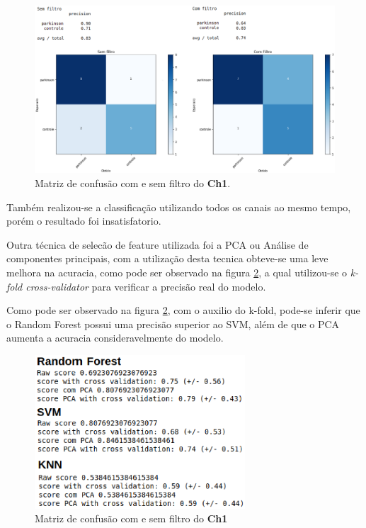 \begin{figure}[!htb]
	\centering
	\includegraphics[width=1.1\textwidth]{figuras/filtroComp.eps}
	\caption{Matriz de confusão com e sem filtro do \textbf{Ch1}.}
	\label{comesemfiltro}
\end{figure}

Também realizou-se a classificação utilizando todos os canais ao mesmo tempo, porém o resultado foi insatisfatorio.

Outra técnica de selecão de feature utilizada foi a PCA ou Análise de componentes principais, com a utilização desta tecnica obteve-se uma leve melhora na acuracia, como pode ser observado na figura \ref{pcavalidator}, a qual utilizou-se o \textit{k-fold cross-validator} para verificar a precisão real do modelo.

Como pode ser observado na figura \ref{pcavalidator}, com o auxilio do k-fold, pode-se inferir que o Random Forest possui uma precisão superior ao SVM, além de que o PCA aumenta a acuracia consideravelmente do modelo.

\begin{figure}[!htb]
	\centering
	\includegraphics[width=0.7\textwidth]{figuras/modeloComp.eps}
	\caption{Matriz de confusão com e sem filtro do \textbf{Ch1}}
	\label{pcavalidator}
\end{figure}

